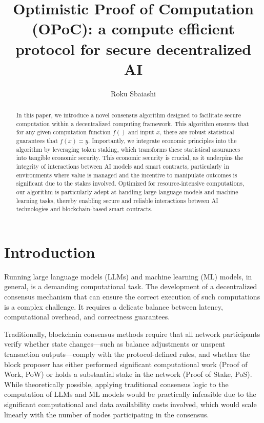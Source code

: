 \documentclass{article}
\title{Optimistic Proof of Computation (OPoC): a compute efficient protocol for secure decentralized AI}
\author{Roku Sbaiashi}
\begin{document}
\maketitle

\begin{abstract}


In this paper, we introduce a novel consensus algorithm designed to facilitate secure computation within a decentralized computing framework. This algorithm ensures that for any given computation function \( f() \) and input \( x \), there are robust statistical guarantees that \( f(x) = y \). Importantly, we integrate economic principles into the algorithm by leveraging token staking, which transforms these statistical assurances into tangible economic security. This economic security is crucial, as it underpins the integrity of interactions between AI models and smart contracts, particularly in environments where value is managed and the incentive to manipulate outcomes is significant due to the stakes involved. Optimized for resource-intensive computations, our algorithm is particularly adept at handling large language models and machine learning tasks, thereby enabling secure and reliable interactions between AI technologies and blockchain-based smart contracts.

\end{abstract}

\section{Introduction}



Running large language models (LLMs) and machine learning (ML) models, in general, is a demanding computational task. The development of a decentralized consensus mechanism that can ensure the correct execution of such computations is a complex challenge. It requires a delicate balance between latency, computational overhead, and correctness guarantees.

Traditionally, blockchain consensus methods require that all network participants verify whether state changes—such as balance adjustments or unspent transaction outputs—comply with the protocol-defined rules, and whether the block proposer has either performed significant computational work (Proof of Work, PoW) or holds a substantial stake in the network (Proof of Stake, PoS). While theoretically possible, applying traditional consensus logic to the computation of LLMs and ML models would be practically infeasible due to the significant computational and data availability costs involved, which would scale linearly with the number of nodes participating in the consensus.
\end{document}
